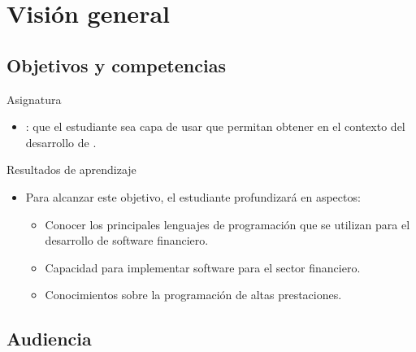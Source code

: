 \section{Visión general}

\subsection{Objetivos y competencias}

\begin{frame}[t]{Asignatura}
\begin{itemize}
  \item {}: 
  que el estudiante sea capa de usar  que
  permitan obtener  en el contexto del desarrollo de 
  .

\end{itemize}
\end{frame}

\begin{frame}[t]{Resultados de aprendizaje}
\begin{itemize}
  \item Para alcanzar este objetivo, el estudiante profundizará en aspectos:
    \begin{itemize}
      \vspace{1.5em}
      \pause
      \item Conocer los principales lenguajes de programación que se utilizan para el desarrollo de software financiero.

      \vspace{1.5em}
      \pause
      \item Capacidad para implementar software para el sector financiero.

      \vspace{1.5em}
      \pause
      \item Conocimientos sobre la programación de altas prestaciones.
    \end{itemize}
\end{itemize}
\end{frame}


\subsection{Audiencia}

